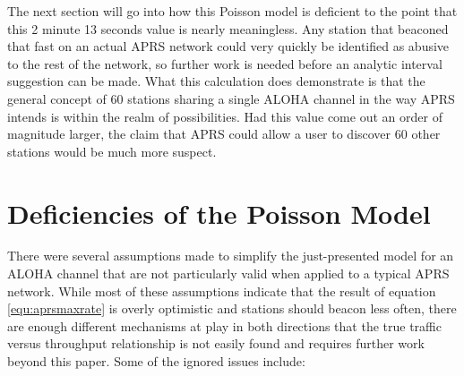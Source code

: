The next section will go into how this Poisson model is deficient to the
point that this 2 minute 13 seconds value is nearly meaningless.
Any station that beaconed that fast on an actual APRS network could very quickly
be identified as abusive to the rest of the network, so further work is needed
before an analytic interval suggestion can be made.
What this calculation does demonstrate is that the general concept of 60 stations
sharing a single ALOHA channel in the way APRS intends is within the realm of
possibilities. 
Had this value come out an order of magnitude larger, the claim
that APRS could allow a user to discover 60 other stations would be much more suspect.

\section{Deficiencies of the Poisson Model}

There were several assumptions made to simplify the just-presented model 
for an ALOHA channel that are not particularly valid 
when applied to a typical APRS network. 
While most of these assumptions indicate that the result of
equation \ref{equ:aprsmaxrate} is overly optimistic and 
stations should beacon less often, there are enough different mechanisms at play
in both directions that the true traffic versus throughput relationship 
is not easily found and requires further work beyond this paper.
Some of the ignored issues include:

